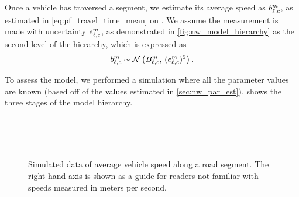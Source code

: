 Once a vehicle has traversed a segment, we estimate its average speed as $b_{\ell,c}^m$, as estimated in \cref{eq:pf_travel_time_mean} on . We assume the measurement is made with uncertainty $e_{\ell,c}^m$, as demonstrated in \cref{fig:nw_model_hierarchy} as the second level of the hierarchy, which is expressed as
\begin{equation}\label{eq:nw_tt_obs_dist}
b_{\ell,c}^m \sim \mathcal{N}\left(B_{\ell,c}^m,\, (e_{\ell,c}^m)^2\right).
\end{equation}



To assess the model, we performed a simulation where all the parameter values are known (based off of the values estimated in \cref{sec:nw_par_est}).  shows the three stages of the model hierarchy.


\begin{knitrout}\small
{}\color{fgcolor}\begin{figure}

{\centering {}\\
\\
\\

}

\caption[Simulated data of average vehicle speed along a road segment]{Simulated data of average vehicle speed along a road segment. The right hand axis is shown as a guide for readers not familiar with speeds measured in meters per second.}\label{fig:nw_sim_data}
\end{figure}


\end{knitrout}


